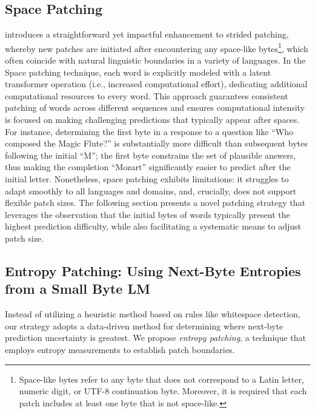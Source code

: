 \subsection{Space Patching}
\label{section:white-patch}

\citet{slagle2024spacebyte} introduces a straightforward yet impactful enhancement to strided patching, whereby new patches are initiated after encountering any space-like bytes\footnote{
    Space-like bytes refer to any byte that does not correspond to a Latin letter, numeric digit, or UTF-8 continuation byte. Moreover, it is required that each patch includes at least one byte that is not space-like. }, which often coincide with natural linguistic boundaries in a variety of languages. In the Space patching technique, each word is explicitly modeled with a latent transformer operation (i.e., increased computational effort), dedicating additional computational resources to every word. This approach guarantees consistent patching of words across different sequences and ensures computational intensity is focused on making challenging predictions that typically appear after spaces. For instance, determining the first byte in a response to a question like ``Who composed the Magic Flute?\uline{\hspace{.6em}}'' is substantially more difficult than subsequent bytes following the initial ``M''; the first byte constrains the set of plausible answers, thus making the completion ``Mozart'' significantly easier to predict after the initial letter. Nonetheless, space patching exhibits limitations: it struggles to adapt smoothly to all languages and domains, and, crucially, does not support flexible patch sizes. The following section presents a novel patching strategy that leverages the observation that the initial bytes of words typically present the highest prediction difficulty, while also facilitating a systematic means to adjust patch size.

\subsection{Entropy Patching: Using Next-Byte Entropies from a Small Byte LM}
\label{section:dyn-patch}

Instead of utilizing a heuristic method based on rules like whitespace detection, our strategy adopts a data-driven method for determining where next-byte prediction uncertainty is greatest. We propose \textit{entropy patching}, a technique that employs entropy measurements to establish patch boundaries.

